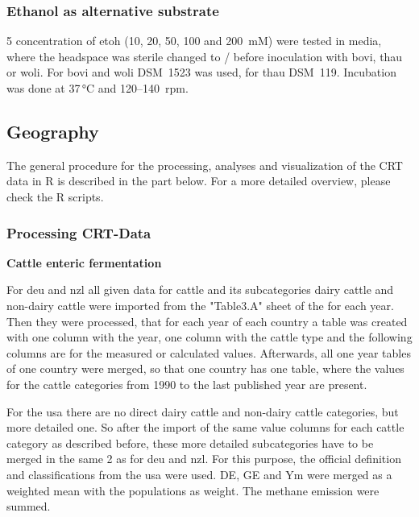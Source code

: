 \subsubsection{Ethanol as alternative substrate}

5 concentration of \acrshort{etoh} (10, 20, 50, 100 and 200~mM) were tested in media, where the headspace was sterile changed to / before inoculation with \acrshort{bovi}, \acrshort{thau} or \acrshort{woli}. For \acrshort{bovi} and \acrshort{woli} DSM~1523 was used, for \acrshort{thau} DSM~119. Incubation was done at 37\,°C and 120--140~rpm.  





\subsection{Geography}

The general procedure for the processing, analyses and visualization of the CRT data in R  is described in the part below. For a more detailed overview, please check the R scripts.

\subsubsection{Processing CRT-Data} 
\label{sec:processing_CRT_DATA}

\textbf{Cattle enteric fermentation}

\noindent For \acrshort{deu} and \acrshort{nzl} all given data for cattle and its subcategories dairy cattle and non-dairy cattle were imported from the "Table3.A" sheet of the  for each year. Then they were processed, that for each year of each country a table was created with one column with the year, one column with the cattle type and the following columns are for the measured or calculated values. Afterwards, all one year tables of one country were merged, so that one country has one table, where the values for the cattle categories from 1990 to the last published year are present. 

For the \acrshort{usa} there are no direct dairy cattle and non-dairy cattle categories, but more detailed one. So after the import of the same value columns for each cattle category as described before, these more detailed subcategories have to be merged in the same 2 as for \acrshort{deu} and \acrshort{nzl}. For this purpose, the official definition and classifications from the \acrshort{usa} \citep[Chapter 5, p.\,6]{epaInventoryUSGreenhouse2024} were used. \acrshort{DE}, \acrshort{GE} and \acrshort{Ym} were merged as a weighted mean with the populations as weight. The methane emission were summed.\clearpage

